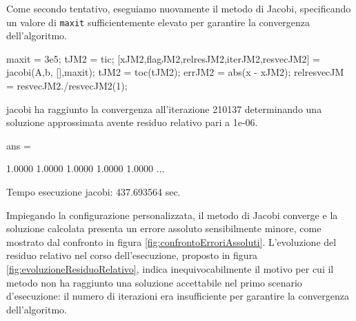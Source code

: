     Come secondo tentativo, eseguiamo nuovamente il metodo di Jacobi, specificando un valore di \lstinline{maxit} sufficientemente elevato per garantire la
    convergenza dell'algoritmo.
    \begin{matlabcode}
    maxit = 3e5;
    tJM2 = tic;
    [xJM2,flagJM2,relresJM2,iterJM2,resvecJM2] = jacobi(A,b,
                                                 [],maxit);
    tJM2 = toc(tJM2);
    errJM2 = abs(x - xJM2);
    relresvecJM = resvecJM2./resvecJM2(1);
    \end{matlabcode}
    \begin{matlaboutput}
    jacobi ha raggiunto la convergenza all'iterazione 210137
    determinando una soluzione approssimata avente residuo
    relativo pari a 1e-06.

    ans =

    1.0000    1.0000    1.0000    1.0000    1.0000    ...
    \end{matlaboutput}
    \begin{matlaboutput}
    Tempo esecuzione jacobi: 437.693564 sec.
    \end{matlaboutput}
    Impiegando la configurazione personalizzata, il metodo di Jacobi converge e la soluzione calcolata presenta un errore assoluto sensibilmente minore, come
    mostrato dal confronto in figura \ref{fig:confrontoErroriAssoluti}.\newline
    L'evoluzione del residuo relativo nel corso dell'esecuzione, proposto in figura \ref{fig:evoluzioneResiduoRelativo}, indica inequivocabilmente il motivo per cui il metodo non ha raggiunto
    una soluzione accettabile nel primo scenario d'esecuzione: il numero di iterazioni era insufficiente per garantire la convergenza dell'algoritmo.


